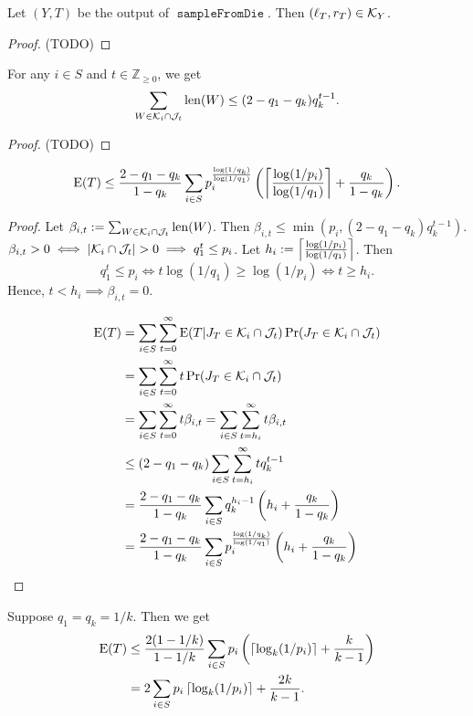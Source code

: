 \documentclass[a4paper, 12pt, fleqn]{article}
\DeclareMathOperator{\sampleFromDie}{\mathtt{sampleFromDie}}
\DeclareMathOperator{\len}{len}
\begin{document}
\begin{lemma}
Let $(Y, T)$ be the output of $\sampleFromDie$. Then $(\ell_T, r_T) \in \mathcal{K}_Y$.
\end{lemma}
\begin{proof}
(TODO)
\end{proof}

\begin{lemma}
For any $i \in S$ and $t \in \mathbb{Z}_{\ge 0}$, we get
\[ \sum_{W \in \Kcal_i \cap \Jcal_t} \len(W) \le (2 - q_1 - q_k)q_k^{t-1}. \]
\end{lemma}
\begin{proof}
(TODO)
\end{proof}

\begin{lemma}
\[ \operatorname*{E}(T) \le \frac{2-q_1-q_k}{1-q_k}\sum_{i \in S} p_i^{\frac{\log(1/q_k)}{\log(1/q_1)}}
    \left(\left\lceil \frac{\log(1/p_i)}{\log(1/q_1)} \right\rceil + \frac{q_k}{1-q_k}\right). \]
\end{lemma}
\begin{proof}
Let $\beta_{i,t} \defeq \sum_{W \in \Kcal_i \cap \Jcal_t} \len(W)$.
Then $\beta_{i,t} \le \min(p_i, (2-q_1-q_k)q_k^{t-1})$.
$\beta_{i,t} > 0 \iff |\mathcal{K}_i \cap \mathcal{J}_t| > 0 \implies q_1^t \le p_i$.
Let $h_i := \left\lceil \frac{\log(1/p_i)}{\log(1/q_1)} \right\rceil$. Then
\[ q_1^t \le p_i \iff t\log(1/q_1) \ge \log(1/p_i) \iff t \ge h_i. \]
Hence, $t < h_i \implies \beta_{i,t} = 0$.

\begin{align*}
\operatorname*{E}(T) &= \sum_{i \in S} \sum_{t=0}^{\infty} \operatorname*{E}(T | J_T \in \mathcal{K}_i \cap \mathcal{J}_t)\Pr(J_T \in \mathcal{K}_i \cap \mathcal{J}_t)
\\ &= \sum_{i \in S} \sum_{t=0}^{\infty} t\Pr(J_T \in \mathcal{K}_i \cap \mathcal{J}_t)
\\ &= \sum_{i \in S} \sum_{t=0}^{\infty} t\beta_{i,t}
= \sum_{i \in S} \sum_{t=h_i}^{\infty} t\beta_{i,t}
\\ &\le (2-q_1-q_k)\sum_{i \in S} \sum_{t=h_i}^{\infty} tq_k^{t-1}
\\ &= \frac{2-q_1-q_k}{1-q_k}\sum_{i \in S} q_k^{h_i-1}\left(h_i + \frac{q_k}{1-q_k}\right)
\\ &= \frac{2-q_1-q_k}{1-q_k}\sum_{i \in S} p_i^{\frac{\log(1/q_k)}{\log(1/q_1)}}\left(h_i + \frac{q_k}{1-q_k}\right)
\qedhere \end{align*}
\end{proof}

Suppose $q_1 = q_k = 1/k$. Then we get
\begin{align*}
\operatorname*{E}(T) &\le \frac{2(1-1/k)}{1-1/k}\sum_{i \in S} p_i\left(\left\lceil \log_k(1/p_i) \right\rceil + \frac{k}{k-1}\right)
\\ &= 2\sum_{i \in S} p_i\left\lceil \log_k(1/p_i) \right\rceil + \frac{2k}{k-1}.
\end{align*}

%
%
\end{document}
